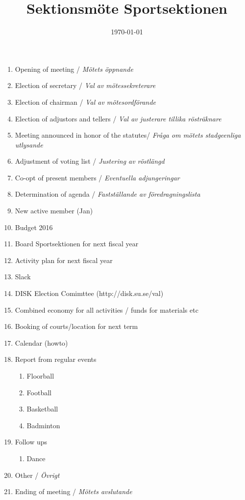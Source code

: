 \documentclass[12pt,a4paper]{article}
\begin{document}
	\title{\Huge Sektionsmöte Sportsektionen}
	\date{\today}
	\maketitle

	\null
	\vfill

	\clearpage

	\begin{enumerate}

		\item Opening of meeting / \emph{Mötets öppnande}
		\item Election of secretary / \emph{Val av mötessekreterare}
		\item Election of chairman / \emph{Val av mötesordförande}
		\item Election of adjustors and tellers / \emph{Val av justerare tillika rösträknare}
		\item Meeting announced in honor of the statutes/ \emph{Fråga om mötets stadgeenliga utlysande}
		\item Adjustment of voting list / \emph{Justering av röstlängd}
		\item Co-opt of present members / \emph{Eventuella adjungeringar}
		\item Determination of agenda / \emph{Fastställande av föredragningslista}

		\item New active member (Jan)
		\item Budget 2016
		\item Board Sportsektionen for next fiscal year
		\item Activity plan for next fiscal year
		\item Slack
		\item DISK Election Comimttee (http://disk.su.se/val)
		\item Combined economy for all activities / funds for materials etc
		\item Booking of courts/location for next term
		\item Calendar (howto)

		\item Report from regular events
		\begin{enumerate}
			\item Floorball
			\item Football
			\item Basketball
			\item Badminton
		\end{enumerate}
		\item Follow ups %
		\begin{enumerate}
			\item Dance
		\end{enumerate}
		\item Other / \emph{Övrigt}
		\item Ending of meeting / \emph{Mötets avslutande}
	\end{enumerate}
\end{document}
